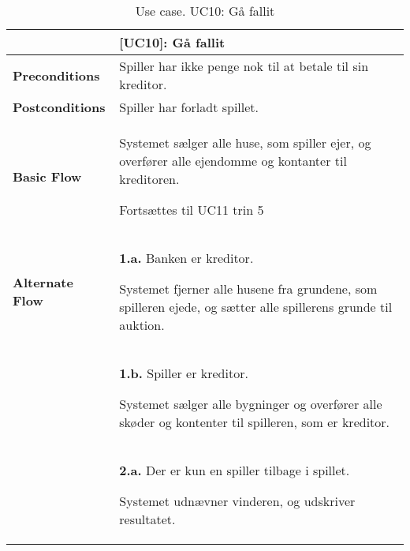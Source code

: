 \documentclass[class=article, crop=false]{standalone}
\begin{document}
    \begin{table}[H]
        \caption{Use case. UC10: Gå fallit}
        \begin{tabularx}{\textwidth}{|l|X|}
            \hline
            & \textbf{[UC10]: Gå fallit}   \\ \hline
            \textbf{Preconditions}       & Spiller har ikke penge nok til at betale til sin kreditor.\\ \hline
            \textbf{Postconditions}      & Spiller har forladt spillet. \\ \hline


            \textbf{Basic Flow} & \begin{tabenum}
                                      \item Systemet sælger alle huse, som spiller ejer, og overfører alle ejendomme og kontanter til kreditoren.
                                      \item Fortsættes til UC11 trin 5
            \end{tabenum}   \\ \hline




            \textbf{Alternate Flow}   & \textbf{1.a.} Banken er kreditor.
            \begin{enumerate} \begin{tabenum}
                                  \item Systemet fjerner alle husene fra grundene, som spilleren ejede, og sætter alle spillerens grunde til auktion.
            \end{tabenum} \end{enumerate}
            \\


                                    & \textbf{1.b.} Spiller er kreditor.
            \begin{enumerate} \begin{tabenum}
                                  \item Systemet sælger alle bygninger og overfører alle skøder og kontenter til spilleren, som er kreditor.
            \end{tabenum} \end{enumerate}
            \\

            & \textbf{2.a.} Der er kun en spiller tilbage i spillet.
            \begin{enumerate} \begin{tabenum}
                                  \item Systemet udnævner vinderen, og udskriver resultatet.
            \end{tabenum} \end{enumerate}

            \\
            \hline

        \end{tabularx}


    \end{table}
\end{document}
